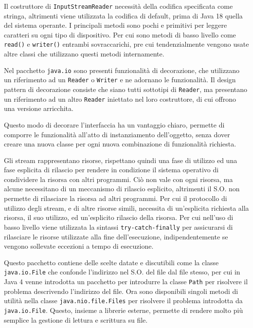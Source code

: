 \documentclass{article}
\numberwithin{equation}{subsection}
\begin{document}
Il costruttore di \verb|InputStreamReader| necessità della codifica specificata come stringa, altrimenti viene utilizzata la codifica di default, prima di Java 18 quella del sistema 
operante. 
I principali metodi sono pochi e primitivi per leggere caratteri su ogni tipo di dispositivo. Per cui sono metodi di basso livello come \verb|read()| e \verb|writer()| 
entrambi sovraccarichi, pre cui tendenzialmente vengono usate altre classi che utilizzano questi metodi internamente. 

Nel pacchetto \verb|java.io| sono presenti funzionalità di decorazione, che utilizzano un riferimento ad un \verb|Reader| o \verb|Writer| e ne adornano le funzionalità. 
Il design pattern di decorazione consiste che siano tutti sottotipi di \verb|Reader|, ma presentano un riferimento ad un altro \verb|Reader| iniettato nel loro costruttore, di cui 
offrono una versione arricchita. 

Questo modo di decorare l'interfaccia ha un vantaggio chiaro, permette di comporre le funzionalità all'atto di instanziamento dell'oggetto, senza dover creare una nuova classe 
per ogni nuova combinazione di funzionalità richiesta. 

Gli stream rappresentano risorse, rispettano quindi una fase di utilizzo ed una fase esplicita di rilascio per rendere in condizione il sistema operativo di condividere la 
risorsa con altri programmi. 
Ciò non vale con ogni risorsa, ma alcune necessitano di un meccanismo di rilascio esplicito, altrimenti il S.O. non permette di rilasciare la risorsa ad altri programmi. 
Per cui il protocollo di utilizzo degli stream, e di altre risorse simili, necessita di un'esplicita richiesta alla risorsa, il suo utilizzo, ed un'esplicito rilascio 
della risorsa. 
Per cui nell'uso di basso livello viene utilizzata la sintassi \verb|try-catch-finally| per assicurarsi di rilasciare le risorse utilizzate alla fine dell'esecuzione, 
indipendentemente se vengono sollevate eccezioni a tempo di esecuzione. 

Questo pacchetto contiene delle scelte datate e discutibili come la classe \verb|java.io.File| che confonde l'indirizzo nel S.O. del file dal file stesso, per cui in Java 4 
venne introdotta un pacchetto per introdurre la classe \verb|Path| per risolvere il problema descrivendo l'indirizzo del file. 
Ora sono disponibili singoli metodi di utilità nella classe \verb|java.nio.file.Files| per risolvere il problema introdotta da \verb|java.io.File|. Questo, insieme a librerie 
esterne, permette di rendere molto più semplice la gestione di lettura e scrittura su file. 
\end{document}
